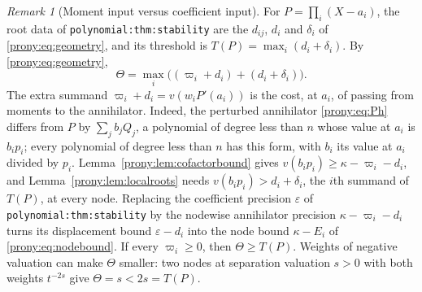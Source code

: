 \documentclass[11pt,letterpaper]{article}
\theoremstyle{definition}
\theoremstyle{remark}
\newtheorem{remark}[theorem]{Remark}
\newcommand{\lbl}[1]{\nolinkurl{#1}}%
\begin{document}
\begin{remark}[Moment input versus coefficient input]
\label{prony:rem:coefficient}
For $P=\prod_i(X-a_i)$, the root data of \lbl{polynomial:thm:stability}
are the $d_{ij}$, $d_i$ and $\delta_i$ of \eqref{prony:eq:geometry}, and its
threshold is $T(P)=\max_i(d_i+\delta_i)$. By \eqref{prony:eq:geometry},
\[
 \Theta=\max_i\bigl((\varpi_i+d_i)+(d_i+\delta_i)\bigr).
\]
The extra summand $\varpi_i+d_i=v(w_iP'(a_i))$ is the cost, at $a_i$, of
passing from moments to the annihilator. Indeed, the perturbed annihilator
\eqref{prony:eq:Ph} differs from $P$ by $\sum_jb_jQ_j$, a polynomial of
degree less than $n$ whose value at $a_i$ is $b_ip_i$; every polynomial of
degree less than $n$ has this form, with $b_i$ its value at $a_i$ divided by
$p_i$. Lemma~\ref{prony:lem:cofactorbound} gives
$v(b_ip_i)\ge\kappa-\varpi_i-d_i$, and Lemma~\ref{prony:lem:localroots} needs
$v(b_ip_i)>d_i+\delta_i$, the $i$th summand of $T(P)$, at every node.
Replacing the coefficient precision $\varepsilon$ of
\lbl{polynomial:thm:stability} by the nodewise annihilator precision
$\kappa-\varpi_i-d_i$ turns its displacement bound $\varepsilon-d_i$ into the
node bound $\kappa-E_i$ of \eqref{prony:eq:nodebound}. If every $\varpi_i\ge0$,
then $\Theta\ge T(P)$. Weights of negative valuation can make $\Theta$
smaller: two nodes at separation valuation $s>0$ with both weights $t^{-2s}$
give $\Theta=s<2s=T(P)$.


\end{remark}
\end{document}
